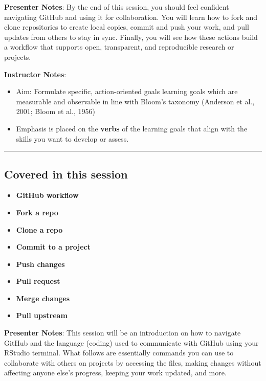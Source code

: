 \documentclass[
  letterpaper,
  DIV=11,
  numbers=noendperiod]{scrartcl}
\providecommand{\tightlist}{%
  \setlength{\itemsep}{0pt}\setlength{\parskip}{0pt}}
\begin{document}
\textbf{Presenter Notes}: By the end of this session, you should feel
confident navigating GitHub and using it for collaboration. You will
learn how to fork and clone repositories to create local copies, commit
and push your work, and pull updates from others to stay in sync.
Finally, you will see how these actions build a workflow that supports
open, transparent, and reproducible research or projects.

\textbf{Instructor Notes}:

\begin{itemize}
\item
  Aim: Formulate specific, action-oriented goals learning goals which
  are measurable and observable in line with Bloom's taxonomy (Anderson
  et al., 2001; Bloom et al., 1956)
\item
  Emphasis is placed on the \textbf{verbs} of the learning goals that
  align with the skills you want to develop or assess.
\end{itemize}

\begin{center}\rule{0.5\linewidth}{0.5pt}\end{center}

\subsection{Covered in this session}\label{covered-in-this-session}

\begin{itemize}
\tightlist
\item
  \textbf{GitHub workflow}
\item
  \textbf{Fork a repo}
\item
  \textbf{Clone a repo}
\item
  \textbf{Commit to a project}
\item
  \textbf{Push changes}
\item
  \textbf{Pull request}
\item
  \textbf{Merge changes}
\item
  \textbf{Pull upstream}
\end{itemize}

\textbf{Presenter Notes}: This session will be an introduction on how to
navigate GitHub and the language (coding) used to communicate with
GitHub using your RStudio terminal. What follows are essentially
commands you can use to collaborate with others on projects by accessing
the files, making changes without affecting anyone else's progress,
keeping your work updated, and more.
\end{document}
